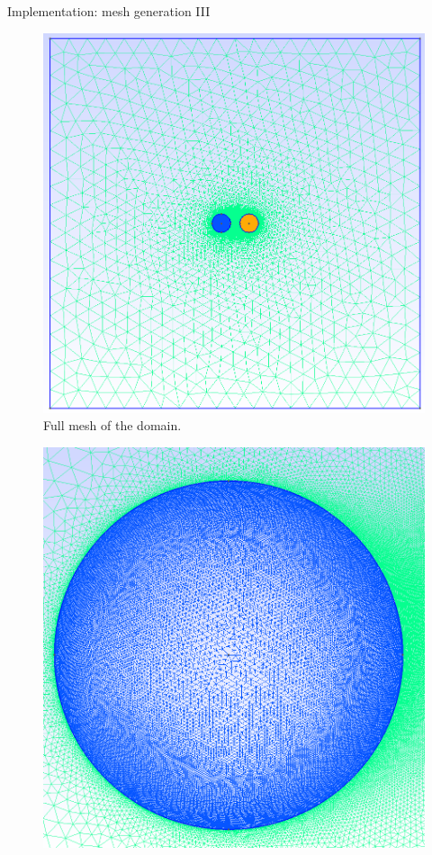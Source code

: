 \documentclass[aspectratio=54,xcolor=dvipsnames]{beamer}
\begin{document}
\begin{frame}{Implementation: mesh generation III}
    \begin{center}
        \begin{minipage}{0.48\textwidth}
            \centering
            \begin{figure}
                \includegraphics[width=\textwidth]{Images/Mesh_full.png}
                \caption{Full mesh of the domain.}
                \label{fig:mesh_full}
            \end{figure}
        \end{minipage}\hfill
        \begin{minipage}{0.48\textwidth}
            \centering
            \begin{figure}
                \includegraphics[width=\textwidth]{Images/Mesh_cond.png}

\end{figure}
\end{minipage}
\end{center}
\end{frame}
\end{document}
